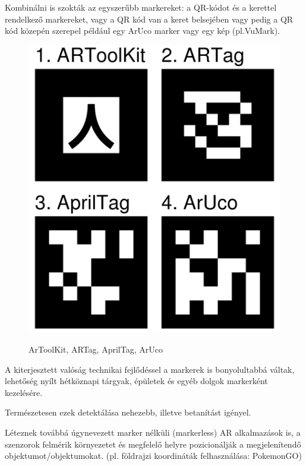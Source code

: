 Kombinálni is szokták az egyszerűbb markereket: a QR-kódot és a kerettel rendelkező markereket, vagy a QR kód van a keret belsejében vagy pedig a QR kód közepén szerepel például egy ArUco marker vagy egy kép (pl.VuMark).

\begin{figure}[htp]
    \centering
   	\includegraphics[width=3truecm, height=3truecm]{images/markerek.png}
	\caption{ArToolKit, ARTag, AprilTag, ArUco}
	\cite{markerek}
\end{figure}



A kiterjesztett valóság technikai fejlődéssel a markerek is bonyolultabbá váltak, lehetőség nyílt hétköznapi tárgyak, épületek és egyéb dolgok markerként kezelésére.

Természetesen ezek detektálása nehezebb, illetve betanítást igényel.

Léteznek továbbá úgynevezett marker nélküli (markerless) AR alkalmazások is, a szenzorok felmérik környezetet és megfelelő helyre pozicionálják a megjelenítendő objektumot/objektumokat. (pl. földrajzi koordináták felhasználása: PokemonGO)

